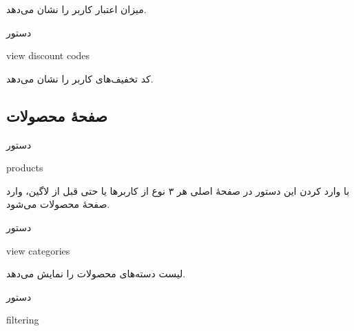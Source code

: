 \documentclass[]{article}
\begin{document}
میزان اعتبار کاربر را نشان می‌دهد.

\hrulefill


\begin{mybox}[colback=yellow]{دستور}

\begin{latin}

view discount codes

\end{latin}

\end{mybox}

کد تخفیف‌های کاربر را نشان می‌دهد.



\newpage

\subsection*{{\titr صفحهٔ محصولات}}

\begin{mybox}[colback=yellow]{دستور}

\begin{latin}

products

\end{latin}

\end{mybox}


با وارد کردن این دستور در صفحهٔ اصلی هر ۳ نوع از کاربرها یا حتی قبل از لاگین، وارد صفحهٔ محصولات می‌شود.

\hrulefill

\begin{mybox}[colback=yellow]{دستور}

\begin{latin}

view categories

\end{latin}

\end{mybox}

لیست دسته‌های محصولات را نمایش می‌دهد.

\hrulefill


\begin{mybox}[colback=yellow]{دستور}

\begin{latin}

filtering

\end{latin}

\end{mybox}
\end{document}
